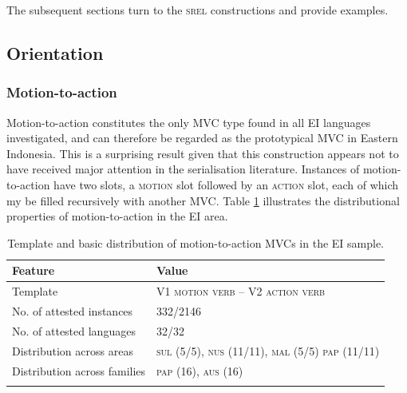 The subsequent sections turn to the \textsc{srel} constructions and provide examples.

\subsection{Orientation} \label{sec:orientation}
\subsubsection{Motion-to-action} \label{sec:motion-to-action}

Motion-to-action constitutes the only MVC type found in all EI languages investigated, and can therefore be regarded as the prototypical MVC in Eastern Indonesia. This is a surprising result given that this construction appears not to have received major attention in the serialisation literature. Instances of motion-to-action have two slots, a \textsc{motion} slot followed by an \textsc{action} slot, each of which my be filled recursively with another MVC. Table \ref{table:motion-to-action} illustrates the distributional properties of motion-to-action in the EI area.

\begin{table}
\begin{tabular}{ll}
\lsptoprule
Feature&Value\tabularnewline
\hline
Template&V1 \textsc{motion verb} -- V2 \textsc{action verb}\tabularnewline
No. of attested instances& 332/2146 \tabularnewline
No. of attested languages& 32/32 \tabularnewline
Distribution across areas& \textsc{sul} (5/5), \textsc{nus} (11/11), \textsc{mal} (5/5) \textsc{pap} (11/11) \tabularnewline
Distribution across families& \textsc{pap} (16), \textsc{aus} (16) \tabularnewline
\lspbottomrule
\end{tabular}
\caption[Template and basic distribution of motion-to-action MVCs]{Template and basic distribution of motion-to-action MVCs in the EI sample.}
\label{table:motion-to-action}
\end{table}

